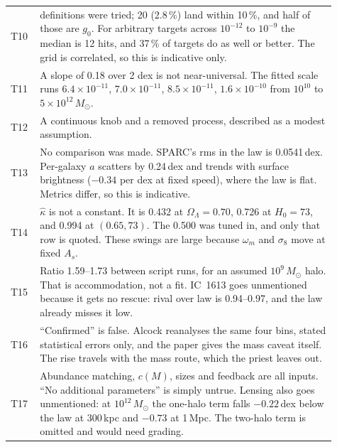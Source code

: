 \documentclass[10pt]{article}
\begin{document}
\begin{tabular}{@{}l>{\raggedright\arraybackslash}p{0.91\linewidth}@{}}
T10 & 714 definitions were tried; 20 (2.8\,\%) land within 10\,\%, and half of those are $g_0$. For arbitrary targets across $10^{-12}$ to $10^{-9}$ the median is 12 hits, and 37\,\% of targets do as well or better. The grid is correlated, so this is indicative only. \\
T11 & A slope of 0.18 over 2 dex is not near-universal. The fitted scale runs $6.4\times10^{-11}$, $7.0\times10^{-11}$, $8.5\times10^{-11}$, $1.6\times10^{-10}$ from $10^{10}$ to $5\times10^{12}\,M_\odot$. \\
T12 & A continuous knob and a removed process, described as a modest assumption. \\
T13 & No comparison was made. SPARC's rms in the law is 0.0541\,dex. Per-galaxy $a$ scatters by 0.24\,dex and trends with surface brightness ($-0.34$ per dex at fixed speed), where the law is flat. Metrics differ, so this is indicative. \\
T14 & $\hat\kappa$ is not a constant. It is 0.432 at $\Omega_\Lambda=0.70$, 0.726 at $H_0=73$, and 0.994 at $(0.65, 73)$. The 0.500 was tuned in, and only that row is quoted. These swings are large because $\omega_m$ and $\sigma_8$ move at fixed $A_s$. \\
T15 & Ratio 1.59--1.73 between script runs, for an assumed $10^9\,M_\odot$ halo. That is accommodation, not a fit. IC~1613 goes unmentioned because it gets no rescue: rival over law is 0.94--0.97, and the law already misses it low. \\
T16 & ``Confirmed'' is false. Alcock reanalyses the same four bins, stated statistical errors only, and the paper gives the mass caveat itself. The rise travels with the mass route, which the priest leaves out. \\
T17 & Abundance matching, $c(M)$, sizes and feedback are all inputs. ``No additional parameters'' is simply untrue. Lensing also goes unmentioned: at $10^{12}\,M_\odot$ the one-halo term falls $-0.22$\,dex below the law at 300\,kpc and $-0.73$ at 1\,Mpc. The two-halo term is omitted and would need grading. \\
\bottomrule
\end{tabular}
\normalsize
\end{document}

